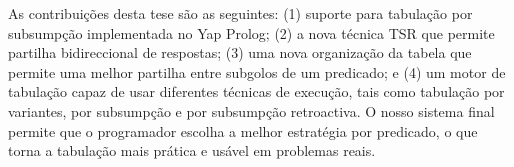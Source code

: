 \documentclass[9pt,a4paper]{extarticle}
\begin{document}
\begin{multicols}{2}
As contribuições desta tese são as seguintes: (1) suporte para tabulação por subsumpção implementada no Yap Prolog;
(2) a nova técnica TSR que permite partilha bidireccional de respostas; (3) uma nova organização da tabela que
permite uma melhor partilha entre subgolos de um predicado; e (4) um motor de tabulação capaz de usar diferentes
técnicas de execução, tais como tabulação por variantes, por subsumpção e por subsumpção retroactiva. O nosso sistema final
permite que o programador escolha a melhor estratégia por predicado, o que torna a tabulação mais prática e
usável em problemas reais.



\end{multicols}
\end{document}
